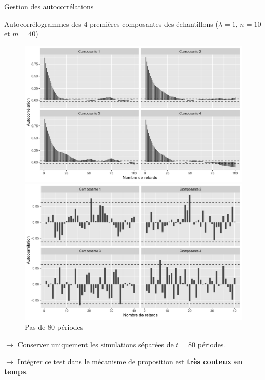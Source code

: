 \documentclass[10pt,xcolor=table,color={dvipsnames,usenames},ignorenonframetext,usepdftitle=false,french]{beamer}
\begin{document}
\begin{frame}{Gestion des autocorrélations}
\protect\hypertarget{gestion-des-autocorruxe9lations}{}

Autocorrélogrammes des 4 premières composantes des échantillons
(\(\lambda = 1\), \(n = 10\) et \(m = 40\))

\begin{figure}
\begin{minipage}{.5\textwidth}
\includegraphics[width=1\textwidth]{img/acfn10m40.png}
\captionsetup{margin=0cm,format=hang,justification=justified}
\caption{Toutes les autocorrélations}
\end{minipage}%
\begin{minipage}{.5\textwidth}
\includegraphics[width=1\textwidth]{img/acfn10m40corr.png}
\captionsetup{margin=0cm,format=hang,justification=justified}
\caption{Pas de 80 périodes}
\end{minipage}
\end{figure}

\bigskip

\(\longrightarrow\) Conserver uniquement les simulations séparées de
\(t = 80\) périodes.

\(\longrightarrow\) Intégrer ce test dans le mécanisme de proposition
est \textbf{très couteux en temps}.

\end{frame}
\end{document}
